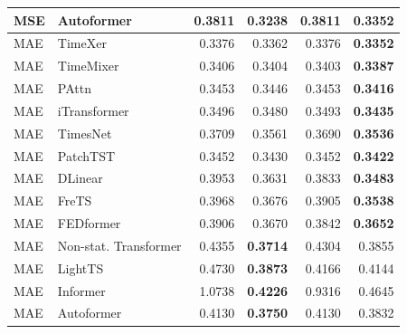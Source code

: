 \begin{longtable}{llrrrr}
MSE & Autoformer & 0.3811 & \textbf{0.3238} & 0.3811 & 0.3352 \\
\midrule
MAE & TimeXer & 0.3376 & 0.3362 & 0.3376 & \textbf{0.3352} \\
MAE & TimeMixer & 0.3406 & 0.3404 & 0.3403 & \textbf{0.3387} \\
MAE & PAttn & 0.3453 & 0.3446 & 0.3453 & \textbf{0.3416} \\
MAE & iTransformer & 0.3496 & 0.3480 & 0.3493 & \textbf{0.3435} \\
MAE & TimesNet & 0.3709 & 0.3561 & 0.3690 & \textbf{0.3536} \\
MAE & PatchTST & 0.3452 & 0.3430 & 0.3452 & \textbf{0.3422} \\
MAE & DLinear & 0.3953 & 0.3631 & 0.3833 & \textbf{0.3483} \\
MAE & FreTS & 0.3968 & 0.3676 & 0.3905 & \textbf{0.3538} \\
MAE & FEDformer & 0.3906 & 0.3670 & 0.3842 & \textbf{0.3652} \\
MAE & Non-stat. Transformer & 0.4355 & \textbf{0.3714} & 0.4304 & 0.3855 \\
MAE & LightTS & 0.4730 & \textbf{0.3873} & 0.4166 & 0.4144 \\
MAE & Informer & 1.0738 & \textbf{0.4226} & 0.9316 & 0.4645 \\
MAE & Autoformer & 0.4130 & \textbf{0.3750} & 0.4130 & 0.3832 \\
\end{longtable}
\endgroup

